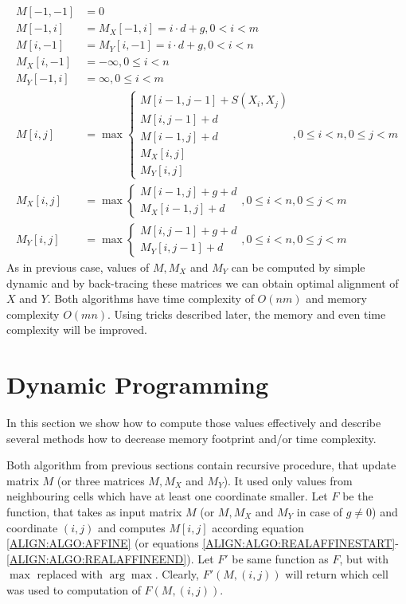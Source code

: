 \begin{align}
M[-1,-1] &= 0\\
M[-1,i] &= M_X[-1,i] = i\cdot d+g, 0 < i < m\\
M[i,-1] &= M_Y[i,-1] = i\cdot d+g, 0 < i < n\\
M_X[i,-1] &= -\infty, 0\leq i< n\\
M_Y[-1,i] &= \infty, 0 \leq i< m\\
M[i,j] &= \max
\begin{cases}\label{ALIGN:ALGO:REALAFFINESTART}
 M[i-1,j-1]+S(X_i,X_j)\\
 M[i,j-1]+d\\
 M[i-1,j]+d\\
 M_X[i,j]\\
 M_Y[i,j]
\end{cases}, 0\leq i<n,0\leq j<m\\
M_X[i,j] &= \max
\begin{cases}
M[i-1,j]+g+d\\
M_X[i-1,j]+d
\end{cases}, 0\leq i<n,0\leq j<m\\
M_Y[i,j] &= \max
\begin{cases}
M[i,j-1]+g+d\\
M_Y[i,j-1]+d
\end{cases}, 0\leq i<n,0\leq j<m\label{ALIGN:ALGO:REALAFFINEEND}
\end{align}
As in previous case, values of $M,M_X$ and $M_Y$ can be computed by simple
dynamic and by back-tracing these matrices we can obtain optimal alignment of
$X$ and $Y$.  Both algorithms have time complexity of $O(nm)$ and memory
complexity $O(mn)$.  Using tricks described later, the memory and even time
complexity will be improved.

\section{Dynamic Programming}\label{DYNPROG}

In this section we show how to compute those values effectively and describe
several methods how to decrease memory footprint and/or time complexity. 

Both algorithm from previous sections contain recursive procedure, that update
matrix $M$ (or three matrices $M,M_X$ and $M_Y$). It used only values from
neighbouring cells which have at least one coordinate smaller. Let $F$ be the
function, that takes as input matrix $M$ (or $M, M_X$ and $M_Y$ in case of
$g\not=0$) and coordinate $(i,j)$ and computes
$M[i,j]$ according equation \ref{ALIGN:ALGO:AFFINE} (or equations
\ref{ALIGN:ALGO:REALAFFINESTART}-\ref{ALIGN:ALGO:REALAFFINEEND}).
Let $F'$ be same function as $F$, but with $\max$ replaced with $\arg\max$.
Clearly, $F'(M,(i,j))$ will return which cell was used to computation of
$F(M,(i,j))$.

